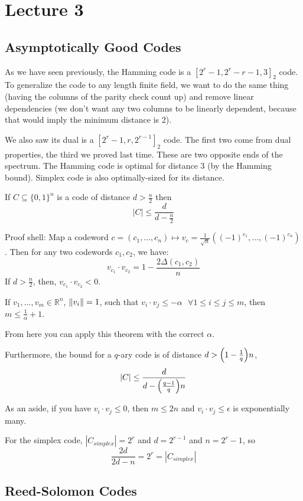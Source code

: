\section{Lecture 3}

\subsection{Asymptotically Good Codes}
As we have seen previously, the Hamming code is a $[2^r - 1, 2^r - r - 1, 3]_2$ code.
To generalize the code to any length finite field, we want to do the same thing (having the columns of the parity check count up) and remove linear dependencies (we don't want any two columns to be linearly dependent, because that would imply the minimum distance is 2).

We also saw its dual is a $[2^r - 1, r, 2^{r - 1}]_2$ code. The first two come from dual properties, the third we proved last time.
These are two opposite ends of the spectrum. The Hamming code is optimal for distance 3 (by the Hamming bound).
Simplex code is also optimally-sized for its distance.

\begin{theorem}
    If $C \subseteq \{0, 1\}^n$ is a code of distance $d > \frac{n}{2}$ then
    \[ |C| \leq \frac{d}{d - \frac{n}{2}} \]

    Proof shell: Map a codeword $c = (c_1, \dots, c_n) \mapsto v_c = \frac{1}{\sqrt{n}} ((-1)^{c_1}, \dots, (-1)^{c_n})$.
    Then for any two codewords $c_1, c_2$, we have:
    \[ v_{c_1} \cdot v_{c_2} = 1 - \frac{2 \Delta(c_1, c_2)}{n} \]
    If $d > \frac{n}{2}$, then, $v_{c_1} \cdot v_{c_2} < 0$.

    \begin{lemma}
        If $v_1, \dots, v_m \in \mathbb{R}^n$, $\norm{v_i} = 1$, such that
        $v_i \cdot v_j \leq - \alpha \text{ } \forall 1 \leq i \leq j \leq m$,
        then $m \leq \frac{1}{\alpha} + 1$.
    \end{lemma}
    From here you can apply this theorem with the correct $\alpha$.

    Furthermore, the bound for a $q$-ary code is of distance $d > \qty(1 - \frac{1}{q})n$,
    \[ |C| \leq \frac{d}{d - \qty(\frac{q - 1}{q})n}\]
\end{theorem}

As an aside, if you have $v_i \cdot v_j \leq 0$, then $m \leq 2n$ and $v_i \cdot v_j \leq \epsilon$ is exponentially many.

For the simplex code, $|C_{simplex}| = 2^r$ and $d = 2^{r - 1}$ and $n = 2^r - 1$,
so
\[ \frac{2d}{2d - n} = 2^r = |C_{simplex}| \]

\subsection{Reed-Solomon Codes}
